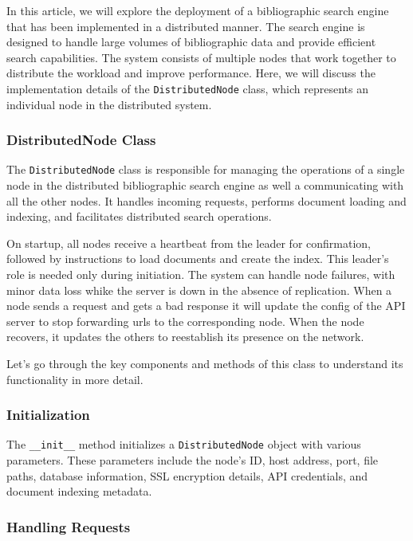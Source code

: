\documentclass{article}
\begin{document}
In this article, we will explore the deployment of a bibliographic search engine that has been 
implemented in a distributed manner. The search engine is designed to handle large volumes of 
bibliographic data and provide efficient search capabilities. The system consists of multiple 
nodes that work together to distribute the workload and improve performance. Here, we will 
discuss the implementation details of the \texttt{DistributedNode} class, which represents an 
individual node in the distributed system.

\subsubsection{DistributedNode Class}
\label{sec:distributed}

The \texttt{DistributedNode} class is responsible for managing the operations of a single node 
in the distributed bibliographic search engine as well a communicating with all the other nodes. 
It handles incoming requests, performs document loading and indexing, and facilitates distributed 
search operations. 

On startup, all nodes receive a heartbeat from the leader for confirmation, followed by 
instructions to load documents and create the index. This leader's role is needed only 
during initiation. The system can handle node failures, with minor data loss whike the 
server is down in the absence of replication. When a node sends a request and gets a bad 
response it will update the config of the API server to stop forwarding urls to the 
corresponding node. When the node recovers, it updates the others to reestablish its 
presence on the network.

Let's go through the key components and methods of this class to understand its functionality
 in more detail.


\subsubsection*{Initialization}

The \texttt{\_\_init\_\_} method initializes a \texttt{DistributedNode} object with various 
parameters. These parameters include the node's ID, host address, port, file paths, database 
information, SSL encryption details, API credentials, and document indexing metadata.


\subsubsection*{Handling Requests}
\end{document}
